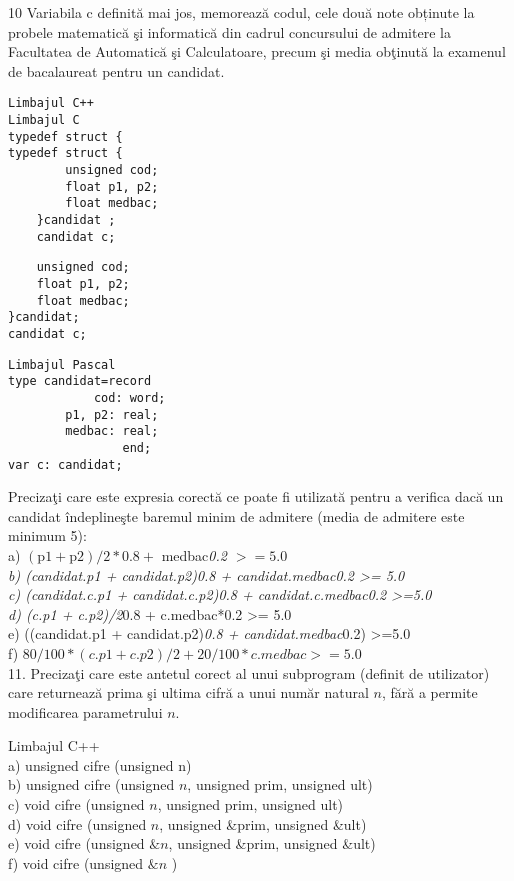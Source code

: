 10 Variabila c definită mai jos, memorează codul, cele două note obținute la probele matematică şi informatică din cadrul concursului de admitere la Facultatea de Automatică şi Calculatoare, precum şi media obţinută la examenul de bacalaureat pentru un candidat.

\begin{verbatim}
Limbajul C++
Limbajul C
typedef struct {
typedef struct {
        unsigned cod;
        float p1, p2;
        float medbac;
    }candidat ;
    candidat c;
\end{verbatim}

\begin{verbatim}
    unsigned cod;
    float p1, p2;
    float medbac;
}candidat;
candidat c;
\end{verbatim}

\begin{verbatim}
Limbajul Pascal
type candidat=record
            cod: word;
        p1, p2: real;
        medbac: real;
                end;
var c: candidat;
\end{verbatim}

Precizaţi care este expresia corectă ce poate fi utilizată pentru a verifica dacă un candidat îndeplineşte baremul minim de admitere (media de admitere este minimum 5):\\
a) $(\mathrm{p} 1+\mathrm{p} 2) / 2 * 0.8+$ medbac\textit{0.2 $>=5.0$\\
b) (candidat.p1 + candidat.p2)\textit{0.8 + candidat.medbac}0.2 >= 5.0\\
c) (candidat.c.p1 + candidat.c.p2)\textit{0.8 + candidat.c.medbac}0.2 >=5.0\\
d) (c.p1 + c.p2)/2}0.8 + c.medbac*0.2 >= 5.0\\
e) ((candidat.p1 + candidat.p2)\textit{0.8 + candidat.medbac}0.2) >=5.0\\
f) $80 / 100 *(c . p 1+c . p 2) / 2+20 / 100 * c . m e d b a c>=5.0$\\
11. Precizaţi care este antetul corect al unui subprogram (definit de utilizator) care returnează prima şi ultima cifră a unui număr natural $n$, fără a permite modificarea parametrului $n$.

Limbajul C++\\
a) unsigned cifre (unsigned n)\\
b) unsigned cifre (unsigned $n$, unsigned prim, unsigned ult)\\
c) void cifre (unsigned $n$, unsigned prim, unsigned ult)\\
d) void cifre (unsigned $n$, unsigned \&prim, unsigned \&ult)\\
e) void cifre (unsigned $\& n$, unsigned \&prim, unsigned \&ult)\\
f) void cifre (unsigned $\& n$ )

